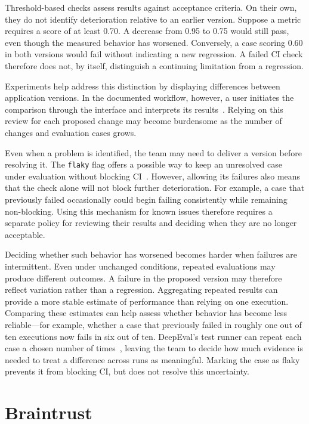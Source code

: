 Threshold-based checks assess results against acceptance criteria. On their
own, they do not identify deterioration relative to an earlier version.
Suppose a metric requires a score of at least 0.70. A
decrease from 0.95 to 0.75 would still pass, even though the measured behavior
has worsened. Conversely, a case scoring 0.60 in both versions would fail
without indicating a new regression. A failed CI check therefore does not, by
itself, distinguish a continuing limitation from a regression.

Experiments help address this distinction by displaying differences between
application versions. In the documented workflow, however, a user initiates
the comparison through the interface and interprets its
results~\parencite{ConfidentAI:Experiments}. Relying on this review for each
proposed change may become burdensome as the number of changes and evaluation
cases grows.

Even when a problem is identified, the team may need to deliver a version
before resolving it. The \texttt{flaky} flag offers a possible way to keep an
unresolved case under evaluation without blocking CI~\parencite{DeepEval:CI}.
However, allowing its failures also means that the check alone will not block
further deterioration. For example, a case that previously failed occasionally
could begin failing consistently while remaining non-blocking. Using this
mechanism for known issues therefore requires a separate policy for reviewing
their results and deciding when they are no longer acceptable.

Deciding whether such behavior has worsened becomes harder when failures are
intermittent. Even under unchanged
conditions, repeated evaluations may produce different outcomes. A failure in
the proposed version may therefore reflect variation rather than a regression.
Aggregating repeated results can provide a more stable estimate of performance
than relying on one execution. Comparing these estimates can help assess
whether behavior has become less reliable---for example, whether a case that
previously failed in roughly one out of ten executions now fails in six out
of ten. DeepEval's test runner can repeat each case a chosen number of
times~\parencite{DeepEval:Flags}, leaving the team to decide how much evidence
is needed to treat a difference across runs as meaningful. Marking the case as
flaky prevents it from blocking CI, but does not resolve this uncertainty.

\section{Braintrust}
\label{sec:case-braintrust}

